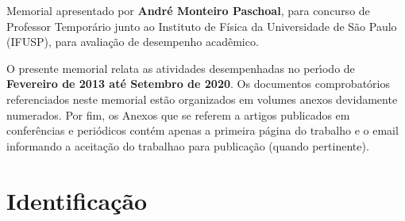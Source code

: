 \documentclass[a4paper,oneside,10pt]{article}
\newcounter{document}%
\begin{document}
\begin{onehalfspace}

Memorial apresentado por \textbf{André Monteiro Paschoal}, para concurso de Professor Temporário junto ao Instituto de Física da Universidade de São Paulo (IFUSP), para avalia\c{c}\~{a}o de desempenho acad\^{e}mico.

O presente memorial relata as atividades desempenhadas no per\'{\i}odo de \textbf{Fevereiro de 2013 até Setembro de 2020}. Os documentos comprobat\'{o}rios referenciados neste memorial est\~{a}o organizados em volumes anexos devidamente numerados. Por fim, os Anexos que se referem a artigos publicados em confer\^{e}ncias e peri\'{o}dicos cont\'{e}m apenas a primeira p\'{a}gina do trabalho e o email informando a aceita\c{c}\~{a}o do trabalhao para publica\c{c}\~{a}o (quando pertinente).

\end{onehalfspace}

\newpage
\section{Identificação}
\end{document}
